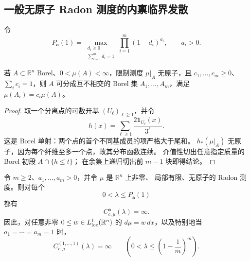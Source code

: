 \subsection{一般无原子 Radon 测度的内禀临界发散}\label{subsec:general-critical-round11}

令
\[
 P_{\boldsymbol a}(1)=
 \max_{\substack{d_i\geq0\\\sum_{i=1}^m d_i=1}}
 \prod_{i=1}^m(1-d_i)^{a_i},\qquad a_i>0. \tag{GC.1}
\]

\begin{lemma}[有限无原子集的精确比例分割]\label{lem:atomless-split-round11}
若 $A\subset\mathbb R^n$ Borel、$0<\mu(A)<\infty$，限制测度 $\mu|_A$ 无原子，且
$c_1,\ldots,c_m\ge0$、$\sum_i c_i=1$，则 $A$ 可分成互不相交的
Borel 集 $A_1,\ldots,A_m$，满足 $\mu(A_i)=c_i\mu(A)$。
\end{lemma}

\begin{proof}
取一个分离点的可数开基 $(U_\ell)_{\ell\ge1}$，并令
\[
 h(x)=\sum_{\ell\ge1}\frac{2\mathbf1_{U_\ell}(x)}{3^\ell}.
\]
这是 Borel 单射：两个点的首个不同基成员的项严格大于尾和。
$h_*(\mu|_A)$ 无原子，因为每个纤维至多一个点，故其分布函数连续。
介值性切出任意指定质量的 Borel 初段 $A\cap\{h\le t\}$；
在余集上递归切出前 $m-1$ 块即得结论。
\end{proof}

\begin{theorem}[一般无原子测度的临界及次临界发散]\label{thm:general-critical-round11}
令 $m\ge2$、$a_1,\ldots,a_m>0$，并令 $\mu$ 是 $\mathbb R^n$ 上非零、
局部有限、无原子的 Radon 测度。则对每个
\[
 0<\lambda\le P_{\boldsymbol a}(1)
\]
都有
\[
 C_{c,\mu}^{\boldsymbol a}(\lambda)=\infty. \tag{GC.2}
\]
因此，对任意非零 $0\le w\in L^1_{\rm loc}(\mathbb R^n)$ 的
$d\mu=w\,dx$，以及特别地当 $a_1=\cdots=a_m=1$ 时，
\[
 C_{c,\mu}^{(1,\ldots,1)}(\lambda)=\infty
 \qquad\left(0<\lambda\le\left(1-\frac1m\right)^m\right). \tag{GC.3}
\]
\end{theorem}

